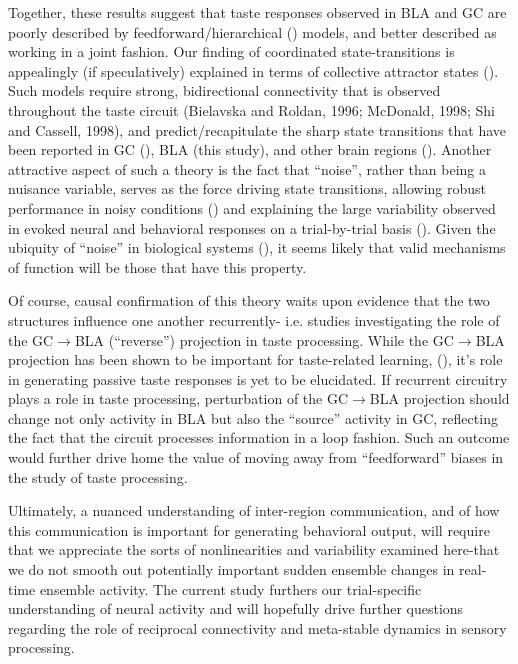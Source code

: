 \begin{refsection}
Together, these results suggest that taste responses observed in BLA and GC are poorly described by feedforward/hierarchical (\cite{parras2017a,glaser2018a,heidari-gorji2021a}) models, and better described as working in a joint fashion. Our finding of coordinated state-transitions is appealingly (if speculatively) explained in terms of collective attractor states (\cite{miller2010a,litwin-kumar2012a,camera2019a,recanatesi2022a}). Such models require strong, bidirectional connectivity that is observed throughout the taste circuit (Bielavska and Roldan, 1996; McDonald, 1998; Shi and Cassell, 1998), and predict/recapitulate the sharp state transitions that have been reported in GC (\cite{jones2007a,sadacca2016a}), BLA (this study), and other brain regions (\cite{seidemann1996a,gat1997a,sugase1999a,latimer2015a}). Another attractive aspect of such a theory is the fact that “noise”, rather than being a nuisance variable, serves as the force driving state transitions, allowing robust performance in noisy conditions (\cite{miller2013a}) and explaining the large variability observed in evoked neural and behavioral responses on a trial-by-trial basis (\cite{kisley1999a,carandini2004a,jones2007a,kotekal2020a,peixoto2021a}). Given the ubiquity of “noise” in biological systems (\cite{shadlen1994a,shadlen1998a,miller2010a}), it seems likely that valid mechanisms of function will be those that have this property. 

Of course, causal confirmation of this theory waits upon evidence that the two structures influence one another recurrently- i.e. studies investigating the role of the GC$\rightarrow$BLA (“reverse”) projection in taste processing. While the GC$\rightarrow$BLA projection has been shown to be important for taste-related learning, (\cite{lavi2018a,kayyal2019a}), it’s role in generating passive taste responses is yet to be elucidated. If recurrent circuitry plays a role in taste processing, perturbation of the GC$\rightarrow$BLA projection should change not only activity in BLA but also the “source” activity in GC, reflecting the fact that the circuit processes information in a loop fashion. Such an outcome would further drive home the value of moving away from “feedforward” biases in the study of taste processing. 

Ultimately, a nuanced understanding of inter-region communication, and of how this communication is important for generating behavioral output, will require that we appreciate the sorts of nonlinearities and variability examined here-that we do not smooth out potentially important sudden ensemble changes in real-time ensemble activity. The current study furthers our trial-specific understanding of neural activity and will hopefully drive further questions regarding the role of reciprocal connectivity and meta-stable dynamics in sensory processing.

\printbibliography[title={References}]

\end{refsection}